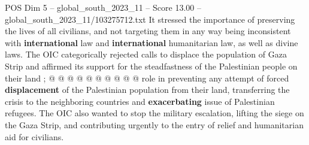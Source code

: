 \begin{textsample}{POS Dim 5 – global\_south\_2023\_11 – Score 13.00 – global\_south\_2023\_11/103275712.txt}
It stressed the importance of preserving the lives of all civilians, and not targeting them in any way being inconsistent with \textbf{international} law and \textbf{international} humanitarian law, as well as divine laws.
The OIC categorically rejected calls to displace the population of Gaza Strip and affirmed its support for the steadfastness of the Palestinian people on their land ; @ @ @ @ @ @ @ @ @ @ role in preventing any attempt of forced \textbf{displacement} of the Palestinian population from their land, transferring the crisis to the neighboring countries and \textbf{exacerbating} issue of Palestinian refugees.
The OIC also wanted to stop the military escalation, lifting the siege on the Gaza Strip, and contributing urgently to the entry of relief and humanitarian aid for civilians.

\end{textsample}
